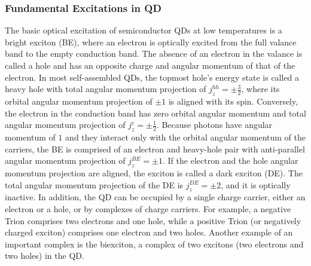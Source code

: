 \subsubsection{Fundamental Excitations in QD}
%
The basic optical excitation of semiconductor QDs at low temperatures is a bright exciton (BE), where an electron is optically excited from the full valance band to the empty conduction band. The absence of an electron in the valance is called a hole and has an opposite charge and angular momentum of that of the electron. In most self-assembled QDs, the topmost hole's energy state is called a heavy hole with total angular momentum projection of $j^{hh}_z=\pm\frac{3}{2}$, where its orbital angular momentum projection of $\pm 1$ is aligned with its spin. Conversely, the electron in the conduction band has zero orbital angular momentum and total angular momentum projection of $j^e_z=\pm\frac{1}{2}$. Because photons have angular momentum of $1$ and they interact only with the orbital angular momentum of the carriers, the BE is comprised of an electron and heavy-hole pair with anti-parallel angular momentum projection of $j^{BE}_z=\pm 1$.
If the electron and the hole angular momentum projection are aligned, the exciton is called a dark exciton (DE). The total angular momentum projection of the DE is $j^{DE}_z=\pm 2$, and it is optically inactive.
%
In addition, the QD can be occupied by a single charge carrier, either an electron or a hole, or by complexes of charge carriers. For example, a negative Trion comprises two electrons and one hole, while a positive Trion (or negatively charged exciton) comprises one electron and two holes. Another example of an important complex is the biexciton, a complex of two excitons (two electrons and two holes) in the QD.
